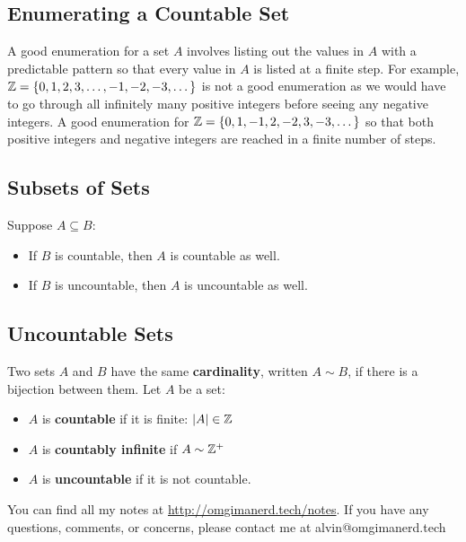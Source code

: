 \documentclass[letterpaper, 12pt]{math}
\begin{document}
\subsection*{Enumerating a Countable Set}
A good enumeration for a set \( A \) involves listing out the values in \( A \)
with a predictable pattern so that every value in \( A \) is listed at a finite
step. For example, \( \mathbb{Z} = \{0,1,2,3,\dots,-1,-2,-3,\dots\} \) is not a good
enumeration as we would have to go through all infinitely many positive
integers before seeing any negative integers. A good enumeration for
\( \mathbb{Z} = \{0,1,-1,2,-2,3,-3,\dots\} \) so that both positive integers and
negative integers are reached in a finite number of steps.

\subsection*{Subsets of Sets}
Suppose \( A\subseteq B \):
\begin{itemize}
  \item If \( B \) is countable, then \( A \) is countable as well.
  \item If \( B \) is uncountable, then \( A \) is uncountable as well.
\end{itemize}

\subsection*{Uncountable Sets}
Two sets \( A \) and \( B \) have the same \textbf{cardinality}, written
\( A\sim B \), if there is a bijection between them.
Let \( A \) be a set:
\begin{itemize}
  \item \( A \) is \textbf{countable} if it is finite: \( |A| \in \mathbb{Z} \)
  \item \( A \) is \textbf{countably infinite} if \( A \sim \mathbb{Z}^{+} \)
  \item \( A \) is \textbf{uncountable} if it is not countable.
\end{itemize}

\begin{center}
  You can find all my notes at \url{http://omgimanerd.tech/notes}. If you have
  any questions, comments, or concerns, please contact me at
  alvin@omgimanerd.tech
\end{center}
\end{document}
